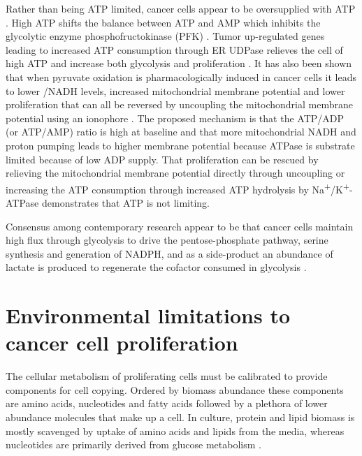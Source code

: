 Rather than being ATP limited, cancer cells appear to be oversupplied with ATP \cite{Scholnick1973-wx}.
High ATP shifts the balance between ATP and AMP which inhibits the glycolytic enzyme phosphofructokinase (PFK) \cite{Dunaway1983-ee}.
Tumor up-regulated genes leading to increased ATP consumption through ER UDPase relieves the cell of high ATP and increase both glycolysis and proliferation \cite{Fang2010-mj, Israelsen2010-ke}.
It has also been shown that when pyruvate oxidation is pharmacologically induced in cancer cells it leads to lower \NAD/NADH levels, increased mitochondrial membrane potential and lower proliferation that can all be reversed by uncoupling the mitochondrial membrane potential using an ionophore \cite{Luengo2021-kb}.
The proposed mechanism is that the ATP/ADP (or ATP/AMP) ratio is high at baseline and that more mitochondrial NADH and proton pumping leads to higher membrane potential because ATPase is substrate limited because of low ADP supply.
That proliferation can be rescued by relieving the mitochondrial membrane potential directly through uncoupling or increasing the ATP consumption through increased ATP hydrolysis by Na\textsuperscript{+}/K\textsuperscript{+}-ATPase demonstrates that ATP is not limiting.

Consensus among contemporary research appear to be that cancer cells maintain high flux through glycolysis to drive the pentose-phosphate pathway, serine synthesis and generation of NADPH, and as a side-product an abundance of lactate is produced to regenerate the \NAD{} cofactor consumed in glycolysis \cite{Vander_Heiden2017-eq, Chandel2021-rf}.




\section{Environmental limitations to cancer cell proliferation}
The cellular metabolism of proliferating cells must be calibrated to provide components for cell copying.
Ordered by biomass abundance these components are amino acids, nucleotides and fatty acids followed by a plethora of lower abundance molecules that make up a cell.
In culture, protein and lipid biomass is mostly scavenged by uptake of amino acids and lipids from the media, whereas nucleotides are primarily derived from glucose metabolism \cite{Hosios2016-us}.

